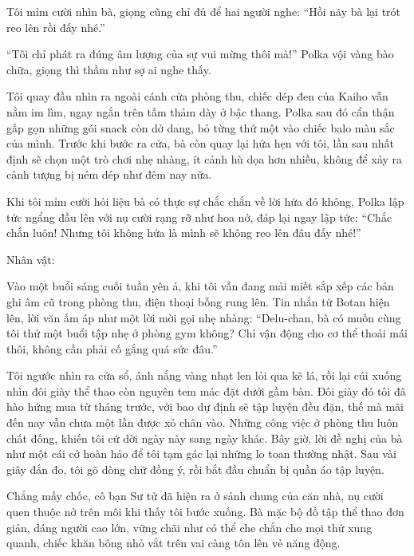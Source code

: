 \documentclass[../main.tex]{subfiles}
\begin{document}
Tôi mỉm cười nhìn bà, giọng cũng chỉ đủ để hai người nghe: ``Hồi nãy bà lại trót reo lên rồi đấy nhé.''

``Tôi chỉ phát ra đúng âm lượng của sự vui mừng thôi mà!'' Polka vội vàng bào chữa, giọng thì thầm như sợ ai nghe thấy.

Tôi quay đầu nhìn ra ngoài cánh cửa phòng thu, chiếc dép đen của Kaiho vẫn nằm im lìm, ngay ngắn trên tấm thảm dày ở bậc thang. Polka sau đó cẩn thận gấp gọn những gói snack còn dở dang, bỏ từng thứ một vào chiếc balo màu sắc của mình. Trước khi bước ra cửa, bà còn quay lại hứa hẹn với tôi, lần sau nhất định sẽ chọn một trò chơi nhẹ nhàng, ít cảnh hù dọa hơn nhiều, không để xảy ra cảnh tượng bị ném dép như đêm nay nữa.

Khi tôi mỉm cười hỏi liệu bà có thực sự chắc chắn về lời hứa đó không, Polka lập tức ngẩng đầu lên với nụ cười rạng rỡ như hoa nở, đáp lại ngay lập tức: ``Chắc chắn luôn! Nhưng tôi không hứa là mình sẽ không reo lên đâu đấy nhé!''

\newpage

\begin{center}
    {\caviar\fontsize{12pt}{12pt}\selectfont Nhân vật:  }
\end{center}

Vào một buổi sáng cuối tuần yên ả, khi tôi vẫn đang mải miết sắp xếp các bản ghi âm cũ trong phòng thu, điện thoại bỗng rung lên. Tin nhắn từ Botan hiện lên, lời văn ấm áp như một lời mời gọi nhẹ nhàng: ``Delu-chan, bà có muốn cùng tôi thử một buổi tập nhẹ ở phòng gym không? Chỉ vận động cho cơ thể thoải mái thôi, không cần phải cố gắng quá sức đâu.''

Tôi ngước nhìn ra cửa sổ, ánh nắng vàng nhạt len lỏi qua kẽ lá, rồi lại cúi xuống nhìn đôi giày thể thao còn nguyên tem mác đặt dưới gầm bàn. Đôi giày đó tôi đã hào hứng mua từ tháng trước, với bao dự định sẽ tập luyện đều đặn, thế mà mãi đến nay vẫn chưa một lần được xỏ chân vào. Những công việc ở phòng thu luôn chất đống, khiến tôi cứ dời ngày này sang ngày khác. Bây giờ, lời đề nghị của bà như một cái cớ hoàn hảo để tôi tạm gác lại những lo toan thường nhật. Sau vài giây đắn đo, tôi gõ dòng chữ đồng ý, rồi bắt đầu chuẩn bị quần áo tập luyện.

Chẳng mấy chốc, cô bạn Sư tử đã hiện ra ở sảnh chung của căn nhà, nụ cười quen thuộc nở trên môi khi thấy tôi bước xuống. Bà mặc bộ đồ tập thể thao đơn giản, dáng người cao lớn, vững chãi như có thể che chắn cho mọi thứ xung quanh, chiếc khăn bông nhỏ vắt trên vai càng tôn lên vẻ năng động.
\end{document}

